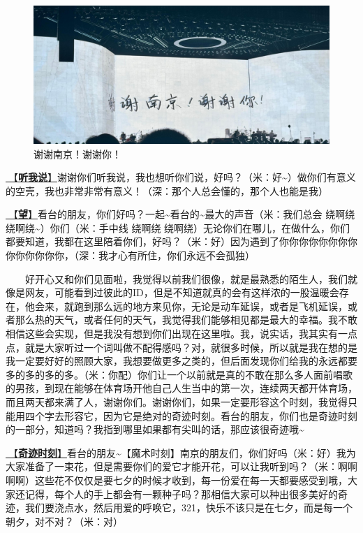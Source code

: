 \documentclass[]{ctexbook}
\begin{document}
\begin{figure}

{\centering \includegraphics[width=400pt]{img/nanjing20240811/thank-nanjing} 

}

\caption{谢谢南京！谢谢你！}\label{fig:unnamed-chunk-75}
\end{figure}

\hyperref[listen-to-me]{🎵【\textbf{听我说}】}谢谢你们听我说，我也想听你们说，好吗？（米：好\textasciitilde）做你们有意义的空壳，我也非常非常有意义！（深：那个人总会懂的，那个人也能是我）

\hyperref[hope]{🎵【\textbf{望}】}看台的朋友，你们好吗？一起\textasciitilde 看台的\textasciitilde 最大的声音（米：我们总会 绕啊绕 绕啊绕\textasciitilde）你们（米：手中线 绕啊绕 绕啊绕）无论你们在哪儿，在做什么，你们都要知道，我都在这里陪着你们，好吗？（米：好）因为遇到了你你你你你你你你你你你你你你，（深：我才心有所住，你们永远不会孤独）

  好开心又和你们见面啦，我觉得以前我们很像，就是最熟悉的陌生人，我们就像是网友，可能看到过彼此的ID，但是不知道就真的会有这样浓的一股温暖会存在，他会来，就跑到那么远的地方来见你，无论是动车延误，或者是飞机延误，或者那么热的天气，或者任何的天气，我觉得我们能够相见都是最大的幸福。我不敢相信这些会实现，但是我没有想到你们出现在这里啦。我，说实话，我其实有一点点，就是大家听过一个词叫做不配得感吗？对，就很多时候，所以就是我在想的是我一定要好好的照顾大家，我想要做更多之类的，但后面发现你们给我的永远都要多的多的多的多。（米：你配）你们让一个以前就是真的不敢在那么多人面前唱歌的男孩，到现在能够在体育场开他自己人生当中的第一次，连续两天都开体育场，而且两天都来满了人，谢谢你们。谢谢你们，如果一定要形容这个时刻，我觉得只能用四个字去形容它，因为它是绝对的奇迹时刻。看台的朋友，你们也是奇迹时刻的一部分，知道吗？我指到哪里如果都有尖叫的话，那应该很奇迹哦\textasciitilde{}

\hyperref[magic-moment]{🎵【\textbf{奇迹时刻}】}看台的朋友\textasciitilde【魔术时刻】南京的朋友们，你们好吗（米：好）我为大家准备了一束花，但是需要你们的爱它才能开花，可以让我听到吗？（米：啊啊啊啊）这些花不仅仅是要七夕的时候才收到，每一份爱在每一天都要感受到哦，大家还记得，每个人的手上都会有一颗种子吗？那相信大家可以种出很多美好的奇迹，我们要浇点水，然后用爱的呼唤它，321，快乐不该只是在七夕，而是每一个朝夕，对不对？（米：对）
\end{document}
